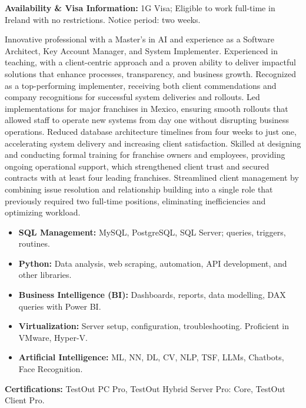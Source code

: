 \documentclass[a4paper,11pt]{article}
\begin{document}
\vspace{0.4cm}

\textbf{Availability \& Visa Information:} 1G Visa; Eligible to work full-time in Ireland with no restrictions. Notice period: two weeks.

Innovative professional with a Master’s in AI and  experience as a Software Architect,      Key Account Manager, and System Implementer. Experienced in teaching, with a client-centric approach and a proven ability to deliver impactful solutions that enhance processes, transparency, and business growth. Recognized as a top-performing implementer, receiving both client commendations and company recognitions for successful system deliveries and rollouts. Led implementations for major franchises in Mexico, ensuring smooth rollouts that allowed staff to operate new systems from day one without disrupting business operations. Reduced database architecture timelines from four weeks to just one, accelerating system delivery and increasing client satisfaction. Skilled at designing and conducting formal training for franchise owners and employees, providing ongoing operational support, which strengthened client trust and secured contracts with at least four leading franchises. Streamlined client management by combining issue resolution and relationship building into a single role that previously required two full-time positions, eliminating inefficiencies and optimizing workload. 

\setlength{\itemsep}{-5pt}
\begin{itemize}[leftmargin=1.2em]
    \item \textbf{SQL Management:} MySQL, PostgreSQL, SQL Server; queries, triggers, routines.
    \item \textbf{Python:} Data analysis, web scraping, automation, API development, and other libraries.
    \item \textbf{Business Intelligence (BI):} Dashboards, reports, data modelling, DAX queries with Power BI.
    \item \textbf{Virtualization:} Server setup, configuration, troubleshooting. Proficient in VMware, Hyper-V.
    \item \textbf{Artificial Intelligence:} ML, NN, DL, CV, NLP, TSF, LLMs, Chatbots, Face Recognition.
\end{itemize}

\textbf{Certifications:} TestOut PC Pro, TestOut Hybrid Server Pro: Core, TestOut Client Pro.
\end{document}
